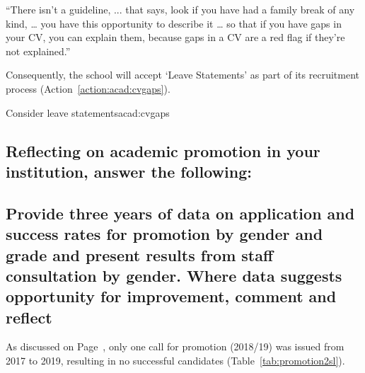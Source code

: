 \begin{myquote}
``There isn’t a guideline, ... that says, look if you have had a family break of any kind, … you have this opportunity to describe it … so that if you have gaps in your CV, you can explain them, because gaps in a CV are a red flag if they're not explained.''
\end{myquote}


Consequently, the school will accept `Leave Statements' as part of its recruitment process (Action~\ref{action:acad:cvgaps}).


\begin{actionblock}{\ksspace{}Consider leave statements}{acad:cvgaps}
\actincludeleavestatement 
\hfill{
    \hypersetup{hidelinks}
    \hyperlink{c6}{\gotoactionsymbol{}}
}
\end{actionblock}


\subsection{Reflecting on academic promotion in your institution, answer the following: }



\subsection{Provide three years of data on application and success rates for promotion by gender and grade and present results from staff consultation by gender. Where data suggests opportunity for improvement, comment and reflect}

As discussed on Page~\pageref{slboundary}, only one call for promotion (2018/19) was issued from 2017 to 2019, resulting in no successful candidates (Table~\ref{tab:promotion2sl}). 


